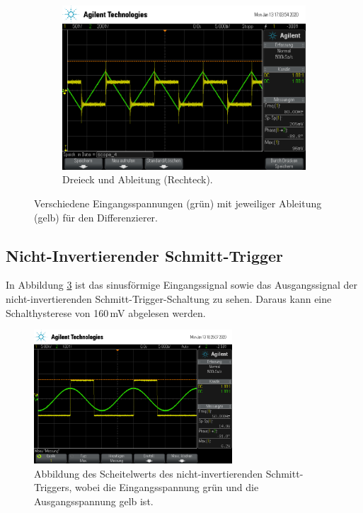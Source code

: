 \begin{figure}
\begin{subfigure}{0.48\textwidth}
                    \end{subfigure}
                    \begin{subfigure}{0.48\textwidth}
                        \centering
                        \includegraphics[width=\textwidth]{scope_4.png}%
                        \caption{Dreieck und Ableitung (Rechteck).}
                        \label{fig:TU}
                    \end{subfigure}
                    \caption{Verschiedene Eingangsspannungen (grün) mit jeweiliger Ableitung (gelb) für den Differenzierer.}
                    \label{fig:dreidiff}
                \end{figure}


        \subsection{Nicht-Invertierender Schmitt-Trigger}

            In Abbildung \ref{fig:schmitt} ist das sinusförmige Eingangssignal sowie 
            das Ausgangssignal der nicht-invertierenden Schmitt-Trigger-Schaltung zu sehen.
            Daraus kann eine Schalthysterese von 160\,mV abgelesen werden.

            \begin{figure}[H]
                \centering 
                \includegraphics[height=5cm]{scope_9.png}
                \caption{Abbildung des Scheitelwerts des nicht-invertierenden Schmitt-Triggers, wobei die 
                Eingangsspannung grün und die Ausgangsspannung gelb ist.}
                \label{fig:schmitt}
            \end{figure}

